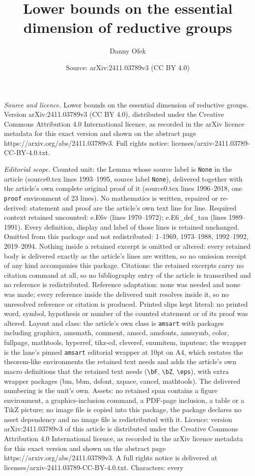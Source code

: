 \documentclass[10pt,a4paper]{amsart}
\title[Lower bounds on the essential dimension of reductive groups]{Lower bounds on the essential dimension of reductive groups}
\author{Danny Ofek}
\date{Source: arXiv:2411.03789v3 (CC BY 4.0)}
\begin{document}
\maketitle

\noindent\emph{Source and licence.} Lower bounds on the essential dimension of reductive groups. Version arXiv:2411.03789v3 (CC BY 4.0), distributed under the Creative Commons Attribution 4.0 International licence, as recorded in the arXiv licence metadata for this exact version and shown on the abstract page https://arxiv.org/abs/2411.03789v3. Full rights notice: licenses/arxiv-2411.03789-CC-BY-4.0.txt.\par\smallskip

\noindent\textit{Editorial scope.} Counted unit: the Lemma whose source label is \texttt{None} in the article (source0.tex lines 1993--1995, source label \texttt{None}), delivered together with the article's own complete original proof of it (source0.tex lines 1996--2018, one \texttt{proof} environment of 23 lines). No mathematics is written, repaired or re-derived: statement and proof are the article's own text line for line. Required context retained uncounted: e.E6v (lines 1970--1972); e.E6\_def\_tau (lines 1989--1991). Every definition, display and label of those lines is retained unchanged. Omitted from this package and not redistributed: 1--1969, 1973--1988, 1992--1992, 2019--2094. Nothing inside a retained excerpt is omitted or altered: every retained body is delivered exactly as the article's lines are written, so no omission receipt of any kind accompanies this package. Citations: the retained excerpts carry no citation command at all, so no bibliography entry of the article is transcribed and no reference is redistributed. Reference adaptation: none was needed and none was made; every reference inside the delivered unit resolves inside it, so no unresolved reference or citation is produced. Printed slips kept literal: no printed word, symbol, hypothesis or number of the counted statement or of its proof was altered. Layout and class: the article's own class is \texttt{amsart} with packages including graphicx, amsmath, comment, amscd, amsfonts, amssymb, color, fullpage, mathtools, hyperref, tikz-cd, cleveref, enumitem, inputenc; the wrapper is the lane's pinned \texttt{amsart} editorial wrapper at 10pt on A4, which restates the theorem-like environments the retained text needs and adds the article's own macro definitions that the retained text needs (\texttt{\textbackslash bF}, \texttt{\textbackslash bZ}, \texttt{\textbackslash eps}), with extra wrapper packages (bm, bbm, dsfont, xspace, cancel, mathtools). The delivered numbering is the unit's own. Assets: no retained span contains a figure environment, a graphics-inclusion command, a PDF-page inclusion, a table or a TikZ picture; no image file is copied into this package, the package declares no asset dependency and no image file is redistributed with it. Licence: version arXiv:2411.03789v3 of this article is distributed under the Creative Commons Attribution 4.0 International licence, as recorded in the arXiv licence metadata for this exact version and shown on the abstract page https://arxiv.org/abs/2411.03789v3. A full rights notice is delivered at licenses/arxiv-2411.03789-CC-BY-4.0.txt. Characters: every 
\end{document}
